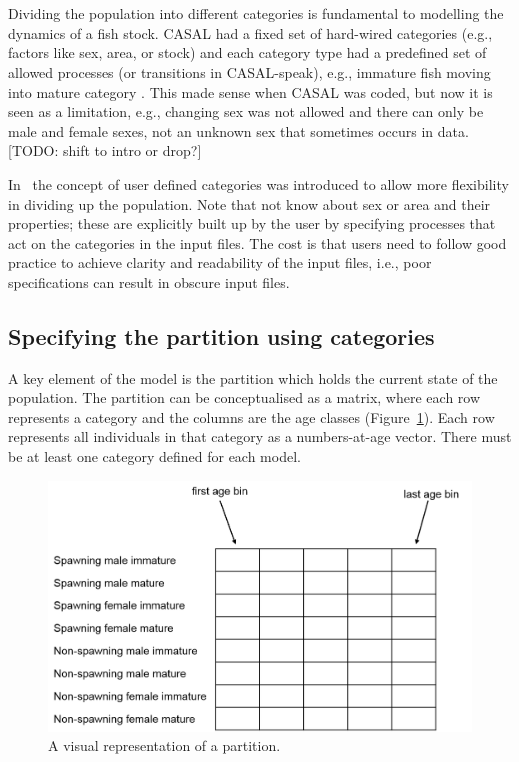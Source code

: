 \section{\label{sec:partition-categories-section}}

Dividing the population into different categories is fundamental to modelling the dynamics of a fish stock. CASAL had a fixed set of hard-wired categories (e.g., factors like sex, area, or stock) and each category type had a predefined set of allowed processes (or transitions in CASAL-speak), e.g., immature fish moving into mature category \citep{1388}. This made sense when CASAL was coded, but now it is seen as a limitation, e.g., changing sex was not allowed and there can only be male and female sexes, not an unknown sex that sometimes occurs in data. [TODO: shift to intro or drop?]

In \CNAME\, the concept of user defined categories was introduced to allow more flexibility in dividing up the population. Note that \CNAME\does not know about sex or area and their properties; these are explicitly built up by the user by specifying processes that act on the categories in the input files. The cost is that users need to follow good practice to achieve clarity and readability of the input files, i.e., poor specifications can result in obscure input files.

\subsection{Specifying the partition using categories}

A key element of the model is the partition which holds the current state of the population. The partition can be conceptualised as a matrix, where each row represents a category and the columns are the age classes (Figure~\ref{Fig:part}). Each row represents all individuals in that category as a numbers-at-age vector.  There must be at least one category defined for each model.

\begin{figure}[H]
	\centering
	\includegraphics[scale=0.4]{Figures/partition2.png}
		\caption{A visual representation of a partition.}\label{Fig:part}
\end{figure}

